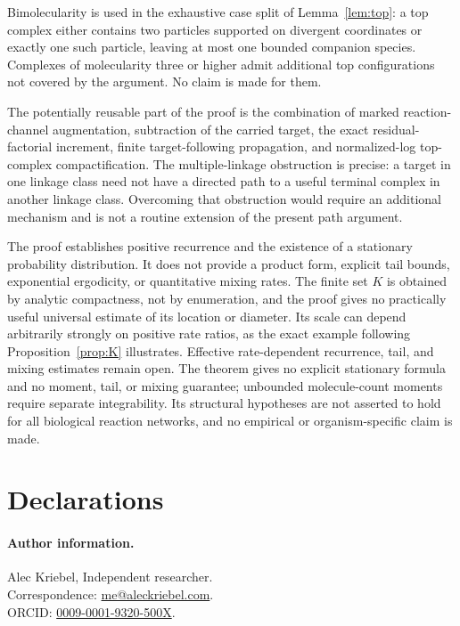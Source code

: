 Bimolecularity is used in the exhaustive case split of
Lemma~\ref{lem:top}: a top complex either contains two particles supported on
divergent coordinates or exactly one such particle, leaving at most one
bounded companion species.  Complexes of molecularity three or higher admit
additional top configurations not covered by the argument.  No claim is made
for them.

The potentially reusable part of the proof is the combination of marked
reaction-channel augmentation, subtraction of the carried target, the exact
residual-factorial increment, finite target-following propagation, and
normalized-log top-complex compactification.  The multiple-linkage obstruction
is precise: a target in one linkage class need not have a directed path to a
useful terminal complex in another linkage class.  Overcoming that obstruction
would require an additional mechanism and is not a routine extension of the
present path argument.

The proof establishes positive recurrence and the existence of a stationary
probability distribution.  It does not provide a product form, explicit tail
bounds, exponential ergodicity, or quantitative mixing rates.  The finite set
\(K\) is obtained by analytic compactness, not by enumeration, and the proof
gives no practically useful universal estimate of its location or diameter.
Its scale can depend arbitrarily strongly on positive rate ratios, as the
exact example following Proposition~\ref{prop:K} illustrates.  Effective
rate-dependent recurrence, tail, and mixing estimates remain open.
The theorem gives no explicit stationary formula and no moment, tail, or
mixing guarantee; unbounded molecule-count moments require separate
integrability.  Its structural hypotheses are not asserted to hold for all
biological reaction networks, and no empirical or organism-specific claim is
made.

\section*{Declarations}

\paragraph{Author information.}
Alec Kriebel, Independent researcher.\\
Correspondence: \mbox{\href{mailto:me@aleckriebel.com}{me@aleckriebel.com}}.\\
ORCID: \href{https://orcid.org/0009-0001-9320-500X}{0009-0001-9320-500X}.

